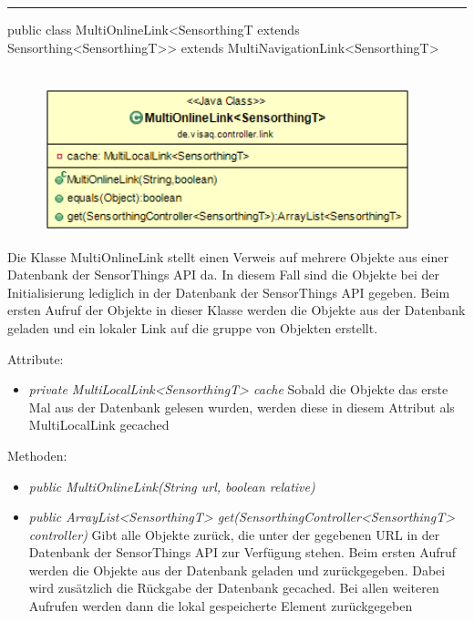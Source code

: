 \rule{\textwidth}{0.4pt}
public class MultiOnlineLink<SensorthingT extends Sensorthing<SensorthingT>> extends MultiNavigationLink<SensorthingT>
\\\\
\begin{minipage}{0.5\textwidth}
    \begin{figure}[H]
        {\centering\includegraphics[width=0.95\textwidth]{media/backend/controller/classes/MultiOnlineLink.png}}
    \end{figure}
    \end{minipage} \hfill
\begin{minipage}{0.5\textwidth}
    Die Klasse MultiOnlineLink stellt einen Verweis auf mehrere Objekte aus einer Datenbank der \gls{SensorThings API} da.
    In diesem Fall sind die Objekte bei der Initialisierung lediglich in der Datenbank der \gls{SensorThings API} gegeben.
    Beim ersten Aufruf der Objekte in dieser Klasse werden die Objekte aus der Datenbank geladen und ein lokaler Link auf die gruppe von Objekten erstellt.
\end{minipage}

Attribute:
\begin{itemize}
    \item \emph{private MultiLocalLink<SensorthingT> cache} Sobald die Objekte das erste Mal aus der Datenbank gelesen wurden, werden diese in diesem Attribut als MultiLocalLink gecached
\end{itemize}
Methoden:
\begin{itemize}
    \item \emph{public MultiOnlineLink(String url, boolean relative)}
    \relativeDescription
    \item \emph{public ArrayList<SensorthingT> get(SensorthingController<SensorthingT> controller)}
    Gibt alle Objekte zurück, die unter der gegebenen URL in der Datenbank der \gls{SensorThings API} zur Verfügung stehen.
    Beim ersten Aufruf werden die Objekte aus der Datenbank geladen und zurückgegeben.
    Dabei wird zusätzlich die Rückgabe der Datenbank gecached.
    Bei allen weiteren Aufrufen werden dann die lokal gespeicherte Element zurückgegeben
\end{itemize}

